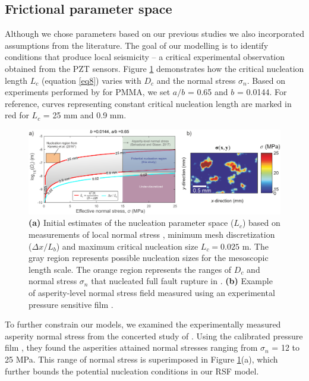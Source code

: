 \documentclass[preprint,1p, 10pt,authoryear]{elsarticle}
\begin{document}
\subsection{Frictional parameter space}
\label{ParameterSpace}
Although we chose parameters based on our previous studies we also incorporated assumptions from the literature. The goal of our modelling is to identify conditions that produce local seismicity -- a critical experimental observation obtained from the PZT sensors. Figure \ref{fig4} demonstrates how the critical nucleation length $L_{c}$ (equation \eqref{eq8}) varies with $D_{c}$ and the normal stress $\sigma_{n}$.  Based on experiments performed by \citet{Berthoude1999} for PMMA, we set $a/b$ = 0.65 and $b$ = 0.0144. For reference, curves representing constant critical nucleation length are marked in red for $L_{c}$ = 25 mm and 0.9 mm.   

\begin{figure}
	\centering
	\includegraphics[scale = 0.95]{FIG4.pdf} 
	\caption{\textbf{(a) }Initial estimates of the nucleation parameter space ($L_{c}$) based on measurements of local normal stress \citep{Selvadurai2017}, minimum mesh discretization ($\Delta x /L_{b}$) and maximum critical nucleation size $L_{c} = 0.025$ m. The gray region represents possible nucleation sizes for the mesoscopic length scale.  The orange region represents the ranges of $D_{c}$ and normal stress $\sigma_{n}$ that nucleated full fault rupture in \citet[][, *$a/b$ = 0.6944]{Kaneko2016}. \textbf{(b) }Example of asperity-level normal stress field measured using an experimental pressure sensitive film \citep[adapted from ][]{Selvadurai2017} \citet{Selvadurai2017}.}
	\label{fig4}
\end{figure}

To further constrain our models, we examined the experimentally measured asperity normal stress from the concerted study of \citet{Selvadurai2017}. Using the calibrated pressure film \citep{Selvadurai2015}, they found the asperities attained normal stresses ranging from $\sigma_{n}$ = 12 to 25 MPa. This range of normal stress is superimposed in Figure \ref{fig4}(a), which further bounds the potential nucleation conditions in our RSF model.
\end{document}
